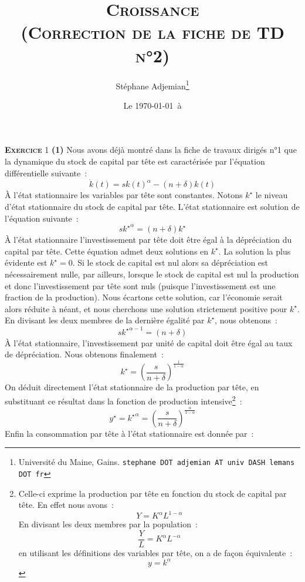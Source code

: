 \documentclass[10pt,a4paper,notitlepage]{report}
\newcommand{\exercice}[1]{\textsc{\textbf{Exercice}} #1}
\newcommand{\question}[1]{\textbf{(#1)}}
\begin{document}
\title{\textsc{Croissance\\ \small{(Correction de la fiche de TD n°2)}}}
\author{Stéphane Adjemian\thanks{Université du Maine, Gains. \texttt{stephane DOT adjemian AT univ DASH lemans DOT fr}}}
\date{Le \today\ à \thistime}

\maketitle


\exercice{1}  \question{1} Nous  avons déjà  montré dans  la fiche  de
travaux dirigés n°1 que la dynamique  du stock de capital par tête est
caractérisée par l'équation différentielle suivante :
\[
\dot k(t) = sk(t)^{\alpha} - (n+\delta)k(t)
\]
À l'état stationnaire  les variables par tête  sont constantes. Notons
$k^{\star}$  le niveau  d'état stationnaire  du stock  de capital  par
tête. L'état stationnaire est solution de l'équation suivante :
\[
s\left. k^{\star}\right.^{\alpha} = (n+\delta)k^{\star}
\]
À l'état  stationnaire l'investissement par  tête doit être égal  à la
dépréciation du capital par tête.  Cette équation admet deux solutions
en $k^{\star}$. La solution la  plus évidente est $k^{\star}=0$. Si le
stock  de capital  est nul  alors sa  dépréciation est  nécessairement
nulle, par ailleurs, lorsque le stock de capital est nul la production
et donc l'investissement par  tête sont nuls (puisque l'investissement
est une fraction de la  production). Nous écartons cette solution, car
l'économie  serait  alors  réduite  à néant,  et  nous  cherchons  une
solution  strictement positive  pour  $k^{\star}$. En  divisant les  deux
membres de la dernière égalité par $k^{\star}$, nous obtenons :
\[
s\left. k^{\star}\right.^{\alpha-1} = (n+\delta)
\]
À l'état stationnaire, l'investissement par unité de capital doit être
égal au taux de dépréciation. Nous obtenons finalement :
\[
k^{\star}= \left(\frac{s}{n+\delta}\right)^{\frac{1}{1-\alpha}}
\]
On déduit directement l'état stationnaire de la production par tête, en substituant ce résultat dans la fonction de production intensive\footnote{Celle-ci exprime la production par tête en fonction du stock de capital par tête. En effet nous avons :
\[
Y = K^{\alpha}L^{1-\alpha}
\]
En divisant les deux membres par la population :
\[
\frac{Y}{L} = K^{\alpha}L^{-\alpha}
\]
en utilisant les définitions des variables par tête, on a de façon équivalente :
\[
y = k^{\alpha}
\]
} :
\[
y^{\star} = \left.k^{\star}\right.^{\alpha}= \left(\frac{s}{n+\delta}\right)^{\frac{\alpha}{1-\alpha}}
\]
Enfin la consommation par tête à l'état stationnaire est donnée par :
\end{document}
